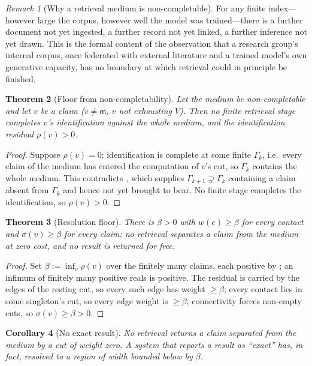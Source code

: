 \documentclass[11pt,twocolumn,a4paper]{article}
\theoremstyle{frathm}
\newtheorem{theorem}{Theorem}[section]
\newtheorem{corollary}[theorem]{Corollary}
\theoremstyle{definition}
\theoremstyle{remark}
\newtheorem{remark}[theorem]{Remark}
\newcommand{\Gph}{\Gamma}
\newcommand{\V}{V}
\newcommand{\wt}{w}
\newcommand{\med}{\mathsf{m}}
\newcommand{\flo}{\beta}
\newcommand{\str}{\sigma}
\newcommand{\res}{\rho}
\begin{document}
\begin{remark}[Why a retrieval medium is non-completable]
\label{rem:why}
For any finite index---however large the corpus, however well the model
was trained---there is a further document not yet ingested, a further
record not yet linked, a further inference not yet drawn. This is the
formal content of the observation that a research group's internal
corpus, once federated with external literature and a trained model's own
generative capacity, has no boundary at which retrieval could in
principle be finished.
\end{remark}

\begin{theorem}[Floor from non-completability]
\label{thm:floor-derived}
Let the medium be non-completable and let $v$ be a claim
($v\neq\med$, $v$ not exhausting $\V$). Then no finite retrieval stage
completes $v$'s identification against the whole medium, and the
identification residual $\res(v)>0$.
\end{theorem}

\begin{proof}
Suppose $\res(v)=0$: identification is complete at some finite $\Gph_k$,
i.e.\ every claim of the medium has entered the computation of $v$'s cut,
so $\Gph_k$ contains the whole medium. This contradicts
, which supplies $\Gph_{k+1}\supsetneq\Gph_k$
containing a claim absent from $\Gph_k$ and hence not yet brought to bear.
No finite stage completes the identification, so $\res(v)>0$.
\end{proof}

\begin{theorem}[Resolution floor]
\label{thm:floor}
There is $\flo>0$ with $\wt(e)\ge\flo$ for every contact and
$\str(v)\ge\flo$ for every claim: no retrieval separates a claim from the
medium at zero cost, and no result is returned for free.
\end{theorem}

\begin{proof}
Set $\flo:=\inf_v\res(v)$ over the finitely many claims, each positive by
; an infimum of finitely many positive reals is
positive. The residual is carried by the edges of the resting cut, so
every such edge has weight $\ge\flo$; every contact lies in some
singleton's cut, so every edge weight is $\ge\flo$; connectivity forces
non-empty cuts, so $\str(v)\ge\flo>0$.
\end{proof}

\begin{corollary}[No exact result]
\label{cor:no-sharp}
No retrieval returns a claim separated from the medium by a cut of weight
zero. A system that reports a result as ``exact'' has, in fact, resolved
to a region of width bounded below by $\flo$.
\end{corollary}
\end{document}
